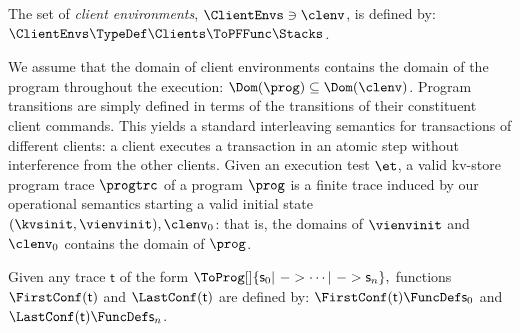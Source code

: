 \begin{definition}
\label{def:client-envs}
The set of \emph{client environments}, \(\ClientEnvs \ni \clenv \), 
is defined by: \( \ClientEnvs \TypeDef \Clients \ToPFFunc \Stacks\).
\end{definition}

We assume that the domain of client environments contains 
the domain of the program throughout the execution: \(\Dom(\prog) \subseteq \Dom(\clenv)\).
Program transitions are simply defined in terms of the transitions of their constituent client commands. 
This yields a standard interleaving semantics for transactions of different clients:  
a client executes a transaction in an atomic step without interference from the other clients. 
Given an execution test \( \et \),
a valid kv-store program trace \( \progtrc \) of a program \( \prog \)
is a finite trace induced by our operational semantics starting a valid initial state \( (\kvsinit,\vienvinit), \clenv_0 \): 
that is, the domains of \( \vienvinit \) and \( \clenv_0 \) contains the domain of \( \prog \).

\begin{definition}
\label{def:last-conf}
Given any trace \( \mathsf{t} \) of the form
\(
\ToProg[]{\mathsf{s}_0 | \ -> \cdots | \ -> \mathsf{s}_n },
\)
functions \( \FirstConf(\mathsf{t}) \) and \( \LastConf(\mathsf{t}) \) are defined by:
\( \FirstConf(\mathsf{t}) \FuncDef \mathsf{s}_0 \) and \( \LastConf(\mathsf{t}) \FuncDef \mathsf{s}_n \).
\end{definition}

